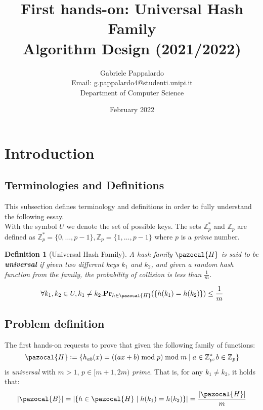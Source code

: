 \documentclass{article}
\title{First hands-on: Universal Hash Family\\[1ex] \large Algorithm Design (2021/2022)}
\author{Gabriele Pappalardo\\Email: g.pappalardo4@studenti.unipi.it\\Department of Computer Science}
\date{February 2022}
\newcommand{\defeq}{\vcentcolon=}
\newcommand{\Hb}{\pazocal{H}}
\newcommand{\Bb}{\pazocal{B}}
\newtheorem{definition*}[theorem]{Definition}
\begin{document}
\maketitle

\section{Introduction}

\subsection{Terminologies and Definitions}

This subsection defines terminology and definitions in order to fully understand the following essay.\\

\noindent With the symbol $U$ we denote the set of possible keys. The sets $\mathbb{Z}_p^*$ and $\mathbb{Z}_p$ are defined as $\mathbb{Z}_p^* = \{0, \dots, p - 1\}, \mathbb{Z}_p = \{1, \dots, p - 1\}$ where $p$ is a \textit{prime} number.

\begin{definition*}[Universal Hash Family]
A hash family $\Hb$ is said to be \textbf{universal} if given two different keys $k_1$ and $k_2$, and given a random hash function from the family, the probability of collision is less than $\frac{1}{m}$.

$$
\forall k_1, k_2 \in {U}, k_1 \ne k_2 .\textrm{\textbf{Pr}}_{h \in \Hb}(\{h(k_1) = h(k_2)\}) \le \frac{1}{m}
$$

\end{definition*}

\subsection{Problem definition}

The first hands-on requests to prove that given the following family of functions:
$$
\Hb \defeq \{ h_{ab}(x) = ((ax + b) \bmod p) \bmod m \mid a \in \mathbb{Z}_p^*, b \in \mathbb{Z}_p \}
$$
is \textit{universal} with $m > 1$, $p \in [m + 1, 2m)$ \textit{prime}. That is, for any $k_1 \ne k_2$, it holds that:
$$
|\Bb| = |\{h \in \Hb \mid h(k_1) = h(k_2) \}| = \frac{|\Hb|}{m}
$$
\end{document}
